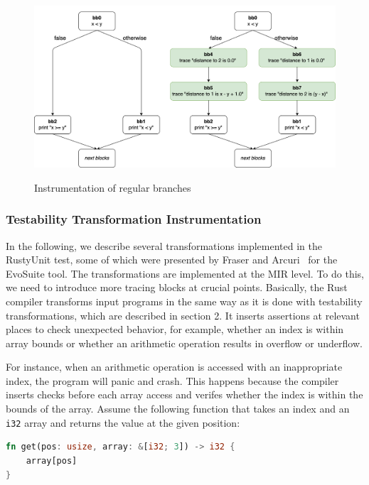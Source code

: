 \documentclass{article}
\begin{document}
\begin{figure}[h]
\caption{Instrumentation of regular branches}
\centering
\includegraphics[width=\textwidth]{comparison-instrumented-branch-cfg}
\label{fig:comparison-instrumented-branch-cfg}
\end{figure}

\subsubsection{Testability Transformation Instrumentation}
\label{sec:mir-testability-transformations}
In the following, we describe several transformations implemented in the RustyUnit test, some of which were presented by Fraser and Arcuri~\cite{Fraser2013} for the EvoSuite tool. The transformations are implemented at the \ac{MIR} level. To do this, we need to introduce more tracing blocks at crucial points. Basically, the Rust compiler transforms input programs in the same way as it is done with testability transformations, which are described in section 2. It inserts assertions at relevant places to check unexpected behavior, for example, whether an index is within array bounds or whether an arithmetic operation results in overflow or underflow.

For instance, when an arithmetic operation is accessed with an inappropriate index, the program will panic and crash. This happens because the compiler inserts checks before each array access and verifes whether the index is within the bounds of the array. Assume the following function that takes an index and an \lstinline{i32} array and returns the value at the given position:
\begin{lstlisting}[language=Rust, style=boxed, caption={}, label=lst:array-index-access-example]
fn get(pos: usize, array: &[i32; 3]) -> i32 {
    array[pos]
}
\end{lstlisting}
\end{document}
